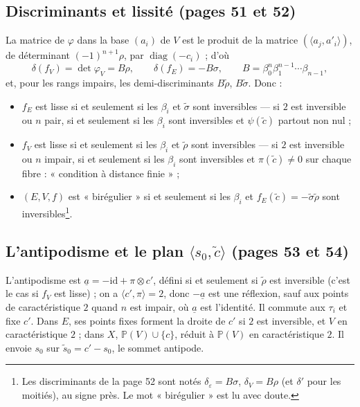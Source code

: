 \documentclass[11pt,a4paper]{article}
\begin{document}
\subsection*{Discriminants et lissité (pages 51 et 52)}

La matrice de $\varphi$ dans la base $(a_i)$ de $V$ est le produit de la matrice
$(\langle a_j, a'_i \rangle)$, de déterminant $(-1)^{n+1}\rho$, par
$\operatorname{diag}(-c_i)$ ; d'où
\[
\delta(f_V) = \det \varphi_V = B\rho, \qquad \delta(f_E) = -B\sigma, \qquad B =
\beta_0^n \beta_1^{n-1} \cdots \beta_{n-1},
\]
et, pour les rangs impairs, les demi-discriminants $B\tilde\rho$, $B\tilde\sigma$.
Donc :
\begin{itemize}
  \item $f_E$ est lisse si et seulement si les $\beta_i$ et $\tilde\sigma$ sont
    inversibles --- si $2$ est inversible ou $n$ pair, si et seulement si les
    $\beta_i$ sont inversibles et $\psi(\tilde c)$ partout non nul ;
  \item $f_V$ est lisse si et seulement si les $\beta_i$ et $\tilde\rho$ sont
    inversibles --- si $2$ est inversible ou $n$ impair, si et seulement si les
    $\beta_i$ sont inversibles et $\pi(\tilde c) \neq 0$ sur chaque fibre :
    « condition à distance finie » ;
  \item $(E, V, f)$ est « birégulier » si et seulement si les $\beta_i$ et
    $f_E(\tilde c) = -\tilde\sigma\tilde\rho$ sont inversibles\footnote{Les
    discriminants de la page 52 sont notés $\delta_\varepsilon = B\sigma$,
    $\delta_V = B\rho$ (et $\delta'$ pour les moitiés), au signe près. Le mot
    « birégulier » est lu avec doute.}.
\end{itemize}

\subsection*{L'antipodisme et le plan $\langle s_0, \tilde c \rangle$ (pages 53 et 54)}

L'antipodisme est $\underline a = -\mathrm{id} + \pi \otimes c'$, défini si et
seulement si $\tilde\rho$ est inversible (c'est le cas si $f_V$ est lisse) ; on a
$\langle c', \pi \rangle = 2$, donc $-\underline a$ est une réflexion, sauf aux
points de caractéristique $2$ quand $n$ est impair, où $\underline a$ est
l'identité. Il commute aux $\tau_i$ et fixe $c'$. Dans $E$, ses points fixes
forment la droite de $c'$ si $2$ est inversible, et $V$ en caractéristique $2$ ;
dans $X$, $\mathbb{P}(V) \cup \{c\}$, réduit à $\mathbb{P}(V)$ en
caractéristique $2$. Il envoie $s_0$ sur $\tilde s_0 = c' - s_0$, le sommet
antipode.
\end{document}
